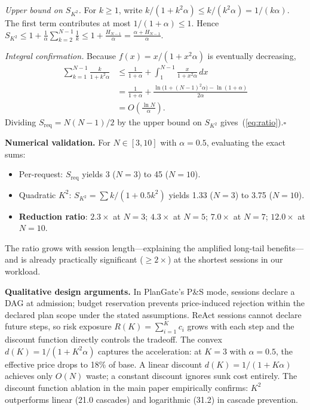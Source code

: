 \documentclass[sigconf,anonymous]{acmart}
\begin{document}
\emph{Upper bound on $S_{K^2}$.}
For $k\geq 1$, write $k/(1{+}k^2\alpha)\leq k/(k^2\alpha)=1/(k\alpha)$.
The first term contributes at most $1/(1{+}\alpha)\leq 1$.
Hence
$S_{K^2} \leq 1 + \frac{1}{\alpha}\sum_{k=2}^{N-1}\frac{1}{k}
       \leq 1 + \frac{H_{N-1}}{\alpha} = \frac{\alpha + H_{N-1}}{\alpha}$.

\emph{Integral confirmation.}
Because $f(x)=x/(1{+}x^2\alpha)$ is eventually decreasing,
\begin{align*}
\sum_{k=1}^{N-1}\frac{k}{1{+}k^2\alpha}
  &\leq \frac{1}{1{+}\alpha}+\int_{1}^{N-1}\!\frac{x}{1{+}x^2\alpha}\,dx \\
  &= \frac{1}{1{+}\alpha}+\frac{\ln\bigl(1{+}(N{-}1)^2\alpha\bigr)-\ln(1{+}\alpha)}{2\alpha} \\
  &= O\!\left(\frac{\ln N}{\alpha}\right).
\end{align*}
Dividing $S_{\text{req}}=N(N{-}1)/2$ by the upper bound on $S_{K^2}$ gives~(\ref{eq:ratio}).\hfill$\square$

\textbf{Numerical validation.}
For $N\in[3,10]$ with $\alpha{=}0.5$, evaluating the exact sums:
\begin{itemize}[nosep,leftmargin=*]
  \item Per-request: $S_{\text{req}}$ yields 3 ($N{=}3$) to 45 ($N{=}10$).
  \item Quadratic $K^2$: $S_{K^2}=\sum k/(1{+}0.5k^2)$ yields 1.33 ($N{=}3$) to 3.75 ($N{=}10$).
  \item \textbf{Reduction ratio}: $2.3\times$ at $N{=}3$; $4.3\times$ at $N{=}5$; $7.0\times$ at $N{=}7$; $12.0\times$ at $N{=}10$.
\end{itemize}
The ratio grows with session length---explaining the amplified long-tail benefits---and is already practically significant ($\geq 2\times$) at the shortest sessions in our workload.

\textbf{Qualitative design arguments.}
In PlanGate's P\&S mode, sessions declare a DAG at admission; budget reservation prevents price-induced rejection within the declared plan scope under the stated assumptions. ReAct sessions cannot declare future steps, so risk exposure $R(K) = \sum_{i=1}^{K} c_i$ grows with each step and the discount function directly controls the tradeoff. The convex $d(K)=1/(1+K^2\alpha)$ captures the acceleration: at $K{=}3$ with $\alpha{=}0.5$, the effective price drops to 18\% of base. A linear discount $d(K)=1/(1+K\alpha)$ achieves only $O(N)$ waste; a constant discount ignores sunk cost entirely. The discount function ablation in the main paper empirically confirms: $K^2$ outperforms linear (21.0 cascades) and logarithmic (31.2) in cascade prevention.
\end{document}
